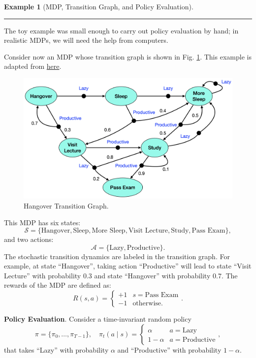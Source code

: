 \documentclass[
]{book}
\theoremstyle{definition}
\theoremstyle{definition}
\newtheorem{example}{Example}[chapter]
\theoremstyle{definition}
\theoremstyle{definition}
\theoremstyle{remark}
\begin{document}
\begin{example}[MDP, Transition Graph, and Policy Evaluation]
\begin{center}\rule{0.5\linewidth}{0.5pt}\end{center}

The toy example was small enough to carry out policy evaluation by hand; in realistic MDPs, we will need the help from computers.

Consider now an MDP whose transition graph is shown in Fig. \ref{fig:mdp-hangover-transition-graph}. This example is adapted from \href{https://github.com/upb-lea/reinforcement_learning_course_materials/blob/master/exercises/solutions/ex02/Ex2.ipynb}{here}.

\begin{figure}

{\centering \includegraphics[width=0.9\linewidth]{images/MDP/hangover-graph} 

}

\caption{Hangover Transition Graph.}\label{fig:mdp-hangover-transition-graph}
\end{figure}

This MDP has six states:
\[
\mathcal{S} = \{\text{Hangover}, \text{Sleep}, \text{More Sleep}, \text{Visit Lecture}, \text{Study}, \text{Pass Exam} \},
\]
and two actions:
\[
\mathcal{A} = \{\text{Lazy}, \text{Productive} \}.
\]
The stochastic transition dynamics are labeled in the transition graph. For example, at state ``Hangover'', taking action ``Productive'' will lead to state ``Visit Lecture'' with probability \(0.3\) and state ``Hangover'' with probability \(0.7\).
The rewards of the MDP are defined as:
\[
R(s,a) = \begin{cases}
+1 & s = \text{Pass Exam} \\
-1 & \text{otherwise}.
\end{cases}.
\]

\textbf{Policy Evaluation}. Consider a time-invariant random policy
\[
\pi = \{\pi_0,\dots,\pi_{T-1} \}, \quad \pi_t(a \mid s) = \begin{cases}
\alpha & a = \text{Lazy} \\
1 - \alpha & a = \text{Productive}
\end{cases},
\]
that takes ``Lazy'' with probability \(\alpha\) and ``Productive'' with probability \(1-\alpha\).


\end{example}
\end{document}
